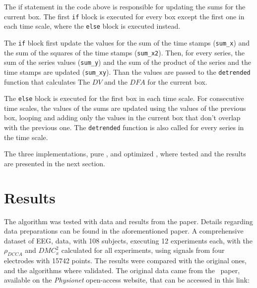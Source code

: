 \documentclass[article]{jss}
\begin{document}
The if statement in the code above is responsible for updating the sums for the current box. The first \verb"if" block is executed for
every box except the first one in each time scale, where the \verb"else" block is executed instead. 

The \verb"if" block first update the values for the sum of the time stamps (\verb"sum_x") and the sum of the squares of the time stamps (\verb"sum_x2"). Then, for every series, the sum of the series values (\verb"sum_y") and the sum of the product of the series and the time stamps are updated (\verb"sum_xy"). Than the values are passed to the \verb"detrended" function that calculates The $DV$ and the $DFA$ for the current box.

The \verb"else" block is executed for the first box in each time scale. For consecutive time scales, the values of the sums are updated using the values of the previous box, looping and adding only the values in the current box that don't overlap with the previous one. The \verb"detrended" function is also called for every series in the time scale.

The three implementations, pure ,  and optimized , where tested and the results are presented in the next section.
 


\section{Results} \label{sec:results}

The algorithm was tested with data and results from the \cite{RIBEIRO2025107419} paper. Details regarding data preparations can be found in the aforementioned paper. A comprehensive dataset of EEG, data, with 108 subjects, executing 12 experiments each, with the $\rho_{DCCA}$ and $DMC_{x}^{2}$ calculated for all experiments, using signals from four electrodes with 15742 points. The results were compared with the original ones, and the algorithms where validated. The original data came from the~\cite{schalk2004bci2000} paper, available on the \textit{Physionet} open-access website, that can be accessed in this link:
\end{document}
